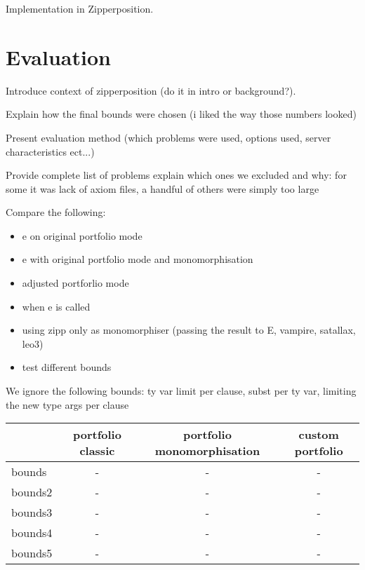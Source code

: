 \documentclass{article}
\begin{document}
Implementation in Zipperposition.

\break

\section{Evaluation}

Introduce context of zipperposition (do it in intro or background?).

Explain how the final bounds were chosen (i liked the way those numbers looked)

Present evaluation method (which problems were used, options used, server characteristics ect...)



Provide complete list of problems explain which ones we excluded and why: for some it was lack of axiom files, a handful of others were simply too large

Compare the following:
    \begin{itemize}
        \item e on original portfolio mode
        \item e with original portfolio mode and monomorphisation
        \item adjusted portforlio mode 

        \item when e is called
        \item using zipp only as monomorphiser (passing the result to E, vampire, satallax, leo3)

        \item test different bounds
    \end{itemize}

\break


We ignore the following bounds: ty var limit per clause, subst per ty var, limiting the new type args per clause

\begin{center}
\begin{tabular}{lccc}
   \toprule
   &portfolio classic & portfolio monomorphisation & custom portfolio \\
   \midrule
   bounds  & -  & - & - \\
   bounds2 & - & - & - \\
   bounds3 & - & - & - \\
   bounds4 & - & - & - \\
   bounds5 & - & - & - \\

   \bottomrule
\end{tabular}
\end{center}
\end{document}
